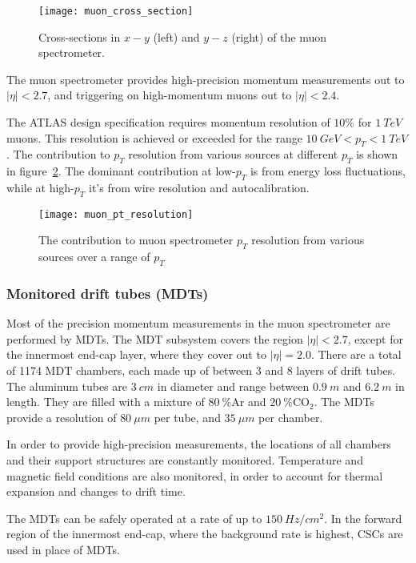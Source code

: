 \begin{figure}[!htbp]
\texttt{[image: muon\_cross\_section]}
\caption{Cross-sections in $x-y$ (left) and $y-z$ (right) of the muon spectrometer.}
\label{fig:muon_cross_section}\cite{muon-2003}
\end{figure}

The muon spectrometer provides high-precision momentum measurements out to $|\eta| < 2.7$,
and triggering on high-momentum muons out to $|\eta| < 2.4$.

The ATLAS design specification requires momentum resolution of $10\%$ for $1~TeV$ muons.
This resolution is achieved or exceeded for the range $10~GeV < p_T < 1~TeV$.
The contribution to $p_T$ resolution from various sources at different $p_T$ is shown in figure~\ref{fig:muon_resolution}.
The dominant contribution at low-$p_T$ is from energy loss fluctuations,
while at high-$p_T$ it's from wire resolution and autocalibration.\cite{muon-2003}

\begin{figure}[h]
\texttt{[image: muon\_pt\_resolution]}
\caption{The contribution to muon spectrometer $p_T$ resolution from various sources over a range of $p_T$}
\label{fig:muon_resolution}\cite{muon-2003}
\end{figure}

\subsubsection{Monitored drift tubes (MDTs)}
Most of the precision momentum measurements in the muon spectrometer are performed by MDTs.
The MDT subsystem covers the region $|\eta| < 2.7$, except for the innermost end-cap layer,
where they cover out to $|\eta| = 2.0$.
There are a total of 1174 MDT chambers, each made up of between 3 and 8 layers of drift tubes.
The aluminum tubes are $3~cm$ in diameter and range between $0.9~m$ and $6.2~m$ in length.
They are filled with a mixture of $80~\% \mathrm{Ar}$ and  $20~\% \mathrm{CO_2}$.
The MDTs provide a resolution of $80~\mu m$ per tube, and $35~\mu m$ per chamber.

In order to provide high-precision measurements, the locations of all chambers and their support structures are constantly monitored.
Temperature and magnetic field conditions are also monitored, in order to account for thermal expansion and changes to drift time.\cite{muon-2003}

The MDTs can be safely operated at a rate of up to $150~Hz/cm^2$.
In the forward region of the innermost end-cap, where the background rate is highest, CSCs are used in place of MDTs.

